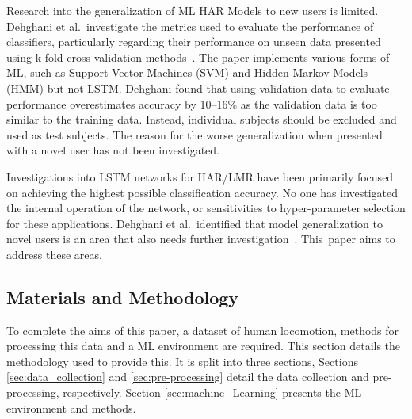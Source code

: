 Research into the generalization of ML HAR Models to new users is limited. Dehghani et al.~investigate the metrics used to evaluate the performance of classifiers, particularly regarding their performance on unseen data presented using k-fold cross-validation methods~\cite{Dehghani2019}. The paper implements various forms of ML, such as Support Vector Machines (SVM) and Hidden Markov Models (HMM) but not LSTM. Dehghani found that using validation data to evaluate performance overestimates accuracy by 10--16\% as the validation data is too similar to the training data. Instead, individual subjects should be excluded and used as test subjects. The reason for the worse generalization when presented with a novel user has not been investigated.

Investigations into LSTM networks for HAR/LMR have been primarily focused on achieving the highest possible classification accuracy. No one has investigated the internal operation of the network, or sensitivities to hyper-parameter selection for these applications. Dehghani et al.~identified that model generalization to novel users is an area that also needs further investigation~\cite{Dehghani2019}. This~paper aims to address these areas.

\subsection{Materials and Methodology}
\label{sec:materials_and_methdology}
To complete the aims of this paper, a dataset of human locomotion, methods for processing this data and a ML environment are required. This section details the methodology used to provide this. It is split into three sections, Sections \ref{sec:data_collection} and \ref{sec:pre-processing} detail the data collection and pre-processing, respectively. Section \ref{sec:machine_Learning} presents the ML environment and methods.


